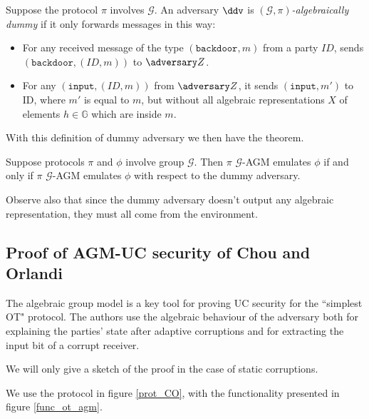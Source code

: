 \begin{definition}
    Suppose the protocol $\pi$ involves $\mathcal G$. An adversary $\ddv$ is \emph{$(\mathcal G, \pi)$-algebraically dummy} if it only forwards messages in this way:
    \begin{itemize}
        \item For any received message of the type $(\texttt{backdoor},m)$ from a party $ID$, sends $(\texttt{backdoor},(ID, m))$ to $\zdv$.
        \item For any $(\texttt{input},(ID, m))$ from $\zdv$, it sends $(\texttt{input}, m')$ to ID, where $m'$ is equal to $m$, but without all algebraic representations $X$ of elements $h\in\mathbb G$ which are inside $m$.
    \end{itemize}
\end{definition}

With this definition of dummy adversary we then have the theorem.

\begin{theorem}
    Suppose protocols $\pi$ and $\phi$ involve group $\mathcal G$. Then $\pi$ $\mathcal G$-AGM emulates $\phi$ if and only if $\pi$ $\mathcal G$-AGM emulates $\phi$ with respect to the dummy adversary.
\end{theorem}

Observe also that since the dummy adversary doesn't output any algebraic representation, they must all come from the environment.

\subsection{Proof of AGM-UC security of Chou and Orlandi}

The algebraic group model is a key tool for proving UC security for the ``simplest OT" protocol. The authors use the algebraic behaviour of the adversary both for explaining the parties' state after adaptive corruptions and for extracting the input bit of a corrupt receiver.

We will only give a sketch of the proof in the case of static corruptions.

We use the protocol in figure \ref{prot_CO}, with the functionality presented in figure \ref{func_ot_agm}.

